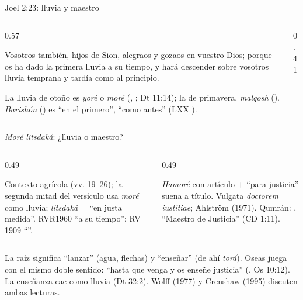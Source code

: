 \begin{frame}{Joel 2:23: lluvia y maestro}
\begin{columns}[c,onlytextwidth]
\begin{column}{0.57\textwidth}
\begin{cita}Vosotros también, hijos de Sion, alegraos y gozaos en \SENOR{} vuestro Dios; porque os ha dado la primera lluvia a su tiempo, y hará descender sobre vosotros lluvia temprana y tardía como al principio.\end{cita}
\scriptsize\RaggedRight
La lluvia  de otoño es \emph{yoré} o \emph{moré} (, ; Dt 11:14); la  de primavera, \emph{malqosh} (). \emph{Barishón} () es ``en el primero'', ``como antes'' (LXX ).
\end{column}
\begin{column}{0.41\textwidth}\end{column}
\end{columns}
\end{frame}

\begin{frame}{\emph{Moré litsdaká}: ¿lluvia o maestro?}
\begin{columns}[t,onlytextwidth]
\begin{column}{0.49\textwidth}
\begin{tcolorbox}[colback=oliva!8,colframe=oliva,boxrule=0.8pt,arc=2pt,left=4pt,right=4pt,fonttitle=\bfseries\small,coltitle=papiro,colbacktitle=oliva,title={(1) Lluvia}]
\scriptsize\RaggedRight Contexto agrícola (vv. 19--26); la segunda mitad del versículo usa \emph{moré} como lluvia; \emph{litsdaká} = ``en justa medida''. RVR1960 ``a su tiempo''; RV 1909 ``''.
\end{tcolorbox}
\end{column}
\begin{column}{0.49\textwidth}
\begin{tcolorbox}[colback=tierraroja!6,colframe=tierraroja,boxrule=0.8pt,arc=2pt,left=4pt,right=4pt,fonttitle=\bfseries\small,coltitle=papiro,colbacktitle=tierraroja,title={(2) Maestro}]
\scriptsize\RaggedRight \emph{Hamoré} con artículo + ``para justicia'' suena a título. Vulgata \emph{doctorem iustitiae}; Ahlström (1971). Qumrán: , ``Maestro de Justicia'' (CD 1:11).
\end{tcolorbox}
\end{column}
\end{columns}\medskip
\small\RaggedRight La raíz  significa ``lanzar'' (agua, flechas) y ``enseñar'' (de ahí \emph{torá}). Oseas juega con el mismo doble sentido: ``hasta que venga y os enseñe justicia'' (, Os 10:12). La enseñanza cae como lluvia (Dt 32:2). Wolff (1977) y Crenshaw (1995) discuten ambas lecturas.
\par\smallskip{}
\end{frame}


